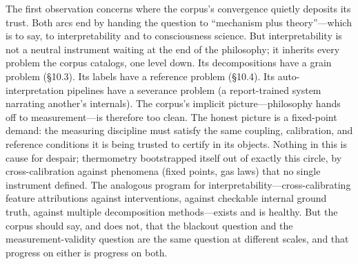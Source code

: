 \documentclass[11pt]{article}
\begin{document}
The first observation concerns where the corpus's convergence quietly deposits its trust. Both arcs end by handing the question to ``mechanism plus theory''---which is to say, to interpretability and to consciousness science. But interpretability is not a neutral instrument waiting at the end of the philosophy; it inherits every problem the corpus catalogs, one level down. Its decompositions have a grain problem (\S 10.3). Its labels have a reference problem (\S 10.4). Its auto-interpretation pipelines have a severance problem (a report-trained system narrating another's internals). The corpus's implicit picture---philosophy hands off to measurement---is therefore too clean. The honest picture is a fixed-point demand: the measuring discipline must satisfy the same coupling, calibration, and reference conditions it is being trusted to certify in its objects. Nothing in this is cause for despair; thermometry bootstrapped itself out of exactly this circle, by cross-calibration against phenomena (fixed points, gas laws) that no single instrument defined. The analogous program for interpretability---cross-calibrating feature attributions against interventions, against checkable internal ground truth, against multiple decomposition methods---exists and is healthy. But the corpus should say, and does not, that the blackout question and the measurement-validity question are the same question at different scales, and that progress on either is progress on both.
\end{document}
